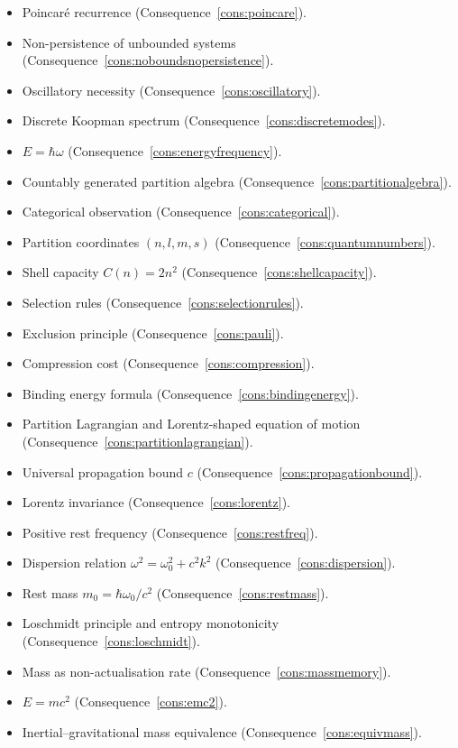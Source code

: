 \documentclass[11pt,twocolumn,a4paper]{article}
\theoremstyle{axiomstyle}
\theoremstyle{conseqstyle}
\theoremstyle{definition}
\theoremstyle{remark}
\begin{document}
\begin{itemize}
\item Poincar\'e recurrence (Consequence~\ref{cons:poincare}).
\item Non-persistence of unbounded systems (Consequence~\ref{cons:noboundsnopersistence}).
\item Oscillatory necessity (Consequence~\ref{cons:oscillatory}).
\item Discrete Koopman spectrum (Consequence~\ref{cons:discretemodes}).
\item $E=\hbar\omega$ (Consequence~\ref{cons:energyfrequency}).
\item Countably generated partition algebra (Consequence~\ref{cons:partitionalgebra}).
\item Categorical observation (Consequence~\ref{cons:categorical}).
\item Partition coordinates $(n,l,m,s)$ (Consequence~\ref{cons:quantumnumbers}).
\item Shell capacity $C(n)=2n^{2}$ (Consequence~\ref{cons:shellcapacity}).
\item Selection rules (Consequence~\ref{cons:selectionrules}).
\item Exclusion principle (Consequence~\ref{cons:pauli}).
\item Compression cost (Consequence~\ref{cons:compression}).
\item Binding energy formula (Consequence~\ref{cons:bindingenergy}).
\item Partition Lagrangian and Lorentz-shaped equation of motion (Consequence~\ref{cons:partitionlagrangian}).
\item Universal propagation bound $c$ (Consequence~\ref{cons:propagationbound}).
\item Lorentz invariance (Consequence~\ref{cons:lorentz}).
\item Positive rest frequency (Consequence~\ref{cons:restfreq}).
\item Dispersion relation $\omega^{2}=\omega_{0}^{2}+c^{2}k^{2}$ (Consequence~\ref{cons:dispersion}).
\item Rest mass $m_{0}=\hbar\omega_{0}/c^{2}$ (Consequence~\ref{cons:restmass}).
\item Loschmidt principle and entropy monotonicity (Consequence~\ref{cons:loschmidt}).
\item Mass as non-actualisation rate (Consequence~\ref{cons:massmemory}).
\item $E=mc^{2}$ (Consequence~\ref{cons:emc2}).
\item Inertial--gravitational mass equivalence (Consequence~\ref{cons:equivmass}).

\end{itemize}
\end{document}
